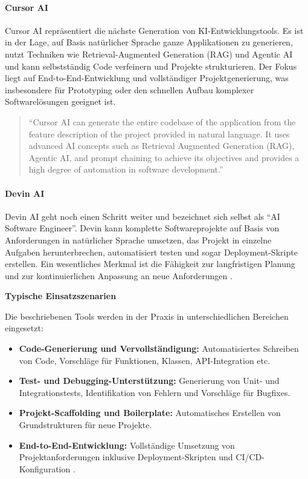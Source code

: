 \paragraph{Cursor AI}
Cursor AI repräsentiert die nächste Generation von KI-Entwicklungstools. Es ist
in der Lage, auf Basis natürlicher Sprache ganze Applikationen zu generieren,
nutzt Techniken wie Retrieval-Augmented Generation (RAG) und Agentic AI und
kann selbstständig Code verfeinern und Projekte strukturieren. Der Fokus liegt
auf End-to-End-Entwicklung und vollständiger Projektgenerierung, was
insbesondere für Prototyping oder den schnellen Aufbau komplexer
Softwarelösungen geeignet ist.

\begin{quote}
    \enquote{Cursor AI can generate the entire codebase of the application from the feature description of the project provided in natural language. It uses advanced AI concepts such as Retrieval Augmented Generation (RAG), Agentic AI, and prompt chaining to achieve its objectives and provides a high degree of automation in software development.}
    \cite[S.~10]{donvir_role_2024}
\end{quote}

\paragraph{Devin AI}
Devin AI geht noch einen Schritt weiter und bezeichnet sich selbst als
\enquote{AI Software Engineer}. Devin kann komplette Softwareprojekte auf Basis
von Anforderungen in natürlicher Sprache umsetzen, das Projekt in einzelne
Aufgaben herunterbrechen, automatisiert testen und sogar Deployment-Skripte
erstellen. Ein wesentliches Merkmal ist die Fähigkeit zur langfristigen Planung
und zur kontinuierlichen Anpassung an neue Anforderungen
\cite[S.~11]{donvir_role_2024}.

\vspace{1em}
\noindent
\textbf{Typische Einsatzszenarien}

Die beschriebenen Tools werden in der Praxis in unterschiedlichen Bereichen
eingesetzt:
\begin{itemize}
    \item \textbf{Code-Generierung und Vervollständigung:} Automatisiertes Schreiben von Code, Vorschläge für Funktionen, Klassen, API-Integration etc.
    \item \textbf{Test- und Debugging-Unterstützung:} Generierung von Unit- und Integrationstests, Identifikation von Fehlern und Vorschläge für Bugfixes.
    \item \textbf{Projekt-Scaffolding und Boilerplate:} Automatisches Erstellen von Grundstrukturen für neue Projekte.
    \item \textbf{End-to-End-Entwicklung:} Vollständige Umsetzung von Projektanforderungen inklusive Deployment-Skripten und CI/CD-Konfiguration \cite[S.~11]{donvir_role_2024}.
\end{itemize}

